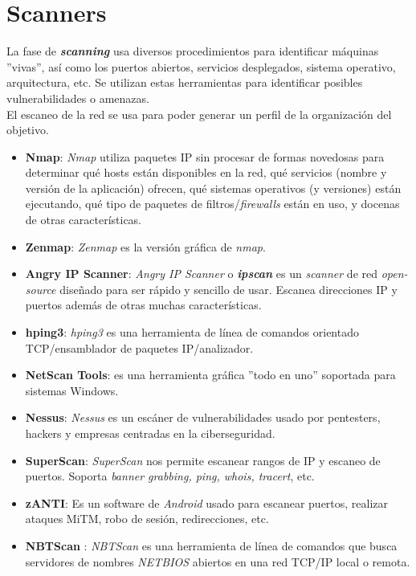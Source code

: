 \documentclass[bibliography=totocnumbered]{scrartcl}
\begin{document}
\newpage
\section{Scanners}
La fase de \textbf{\textit{scanning}} usa diversos procedimientos para identificar máquinas ''vivas'', así como los puertos abiertos, servicios desplegados, sistema operativo, arquitectura, etc. Se utilizan estas herramientas para identificar posibles vulnerabilidades o amenazas.\\
El escaneo de la red se usa para poder generar un perfil de la organización del objetivo.
\begin{itemize}
\item \textbf{Nmap}\parencite{nmap}: \textit{Nmap} utiliza paquetes IP sin procesar de formas novedosas para determinar qué hosts están disponibles en la red, qué servicios (nombre y versión de la aplicación) ofrecen, qué sistemas operativos (y versiones) están ejecutando, qué tipo de paquetes de filtros/\textit{firewalls} están en uso, y docenas de otras características. 
\item \textbf{Zenmap}\parencite{zenmap}: \textit{Zenmap} es la versión gráfica de \textit{nmap}\parencite{nmap}.
\item \textbf{Angry IP Scanner}\parencite{angry}: \textit{Angry IP Scanner} o \textit{\textbf{ipscan}} es un \textit{scanner} de red \textit{open-source} diseñado para ser rápido y sencillo de usar. Escanea direcciones IP y puertos además de otras muchas características.
\item \textbf{hping3}\parencite{hping3}: \textit{hping3} es una herramienta de línea de comandos orientado TCP/ensamblador de paquetes IP/analizador.
\item \textbf{NetScan Tools}\parencite{netscan}: es una herramienta gráfica ''todo en uno'' soportada para sistemas Windows.
\item \textbf{Nessus}\parencite{nessus}: \textit{Nessus} es un escáner de vulnerabilidades usado por pentesters, hackers y empresas centradas en la ciberseguridad.
\item \textbf{SuperScan}\parencite{superscan}: \textit{SuperScan} nos permite escanear rangos de IP y escaneo de puertos. Soporta \textit{banner grabbing, ping, whois, tracert}, etc.
\item \textbf{zANTI}\parencite{zanti}: Es un software de \textit{Android} usado para escanear puertos, realizar ataques MiTM\parencite{mitm}, robo de sesión, redirecciones, etc.
\item \textbf{NBTScan} \parencite{nbtscan}: \textit{NBTScan} es una herramienta de línea de comandos que busca servidores de nombres \textit{NETBIOS}\parencite{netbios} abiertos en una red TCP/IP local o remota.
\end{itemize}
\end{document}
